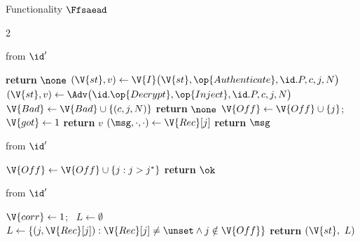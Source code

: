 \begin{interface}[nofloat]{Functionality $\Ffsaead$ \\
}
{\begin{multicols}{2}
\columnbreak

 \quad from $\id'$
\begin{algorithmic}[1]
\algcont
{} \label{ln:fsreceiver}
  \State \textbf{return} $\none$ \label{ln:fsdead}
\EndIf
{}
  \State $(\V{st}, v) \gets \V{I}\bigl(\V{st}, \op{Authenticate}, \id.P, c, j, N\bigr)$ \label{ln:fsauth}
\EndIf
{}
  \State $(\V{st}, v) \gets \Adv\bigl(\id.\op{Decrypt}, \op{Inject}, \id.P, c, j, N\bigr)$ \label{ln:fsinject}
\EndIf
{}
  \State $\V{Bad} \gets \V{Bad} \cup \{(c, j, N)\}$
  \State \textbf{return} $\none$
\EndIf
\State $\V{Off} \gets \V{Off} \cup \{j\}$; \ $\V{got} \gets 1$ \label{ln:fsonce}
  \State \textbf{return} $v$
\EndIf
{} \label{ln:fsnorecord}
\State $(\msg, \cdot, \cdot) \gets \V{Rec}[j]$
\State \textbf{return} $\msg$ \label{ln:fsplain}
\algsave
\end{algorithmic}
\vspace{1.4ex}

 \quad from $\id'$
\begin{algorithmic}[1]
\algcont
{} \label{ln:fsstopdecreq}
\State $\V{Off} \gets \V{Off} \cup \{j : j > j^{*}\}$ \label{ln:fstrim}
\State \textbf{return} $\ok$
\algsave
\end{algorithmic}
\vspace{1.4ex}

 \quad from $\id'$
\begin{algorithmic}[1]
\algcont
{}
\State $\V{corr} \gets 1$; \ $L \gets \emptyset$
  \State $L \gets \{(j, \V{Rec}[j]) : \V{Rec}[j] \neq \unset \wedge j \notin \V{Off}\}$ \label{ln:fsleakrecv}
\EndIf
\State \textbf{return} $(\V{st},\ L)$ \label{ln:fsleaksend}
\algsave
\end{algorithmic}
\end{multicols}}
\end{interface}

